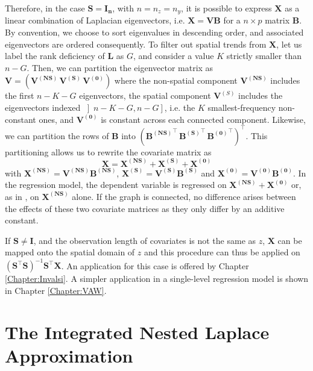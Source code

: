 \documentclass[openany, 11pt, oneside]{book}
\begin{document}
Therefore, in the case $\boldsymbol{S} = \boldsymbol{I_n}$, with $n=n_z = n_y$, it is possible to express $\boldsymbol{X}$ as a linear combination of Laplacian eigenvectors, i.e. $\boldsymbol{X} = \boldsymbol{V B}$ for a $n\times p$ matrix $\boldsymbol{B}$. By convention, we choose to sort eigenvalues in descending order, and associated eigenvectors are ordered consequently. To filter out spatial trends from $\boldsymbol{X}$, let us label the rank deficiency of $\boldsymbol{L}$ as $G$, and consider a value $K$ strictly smaller than $n-G$. Then, we can partition the eigenvector matrix as $\boldsymbol{V} = \left(\boldsymbol{V^{(NS)}}\,\boldsymbol{V^{(S)}}\,\boldsymbol{V^{(0)}} \right)$ where the non-spatial component $\boldsymbol{V^{(NS)}}$ includes the first $n-K-G$ eigenvectors, the spatial component $\boldsymbol{V}^{(S)}$ includes the eigenvectors indexed $\left] n-K-G, n-G\right]$, i.e. the $K$ smallest-frequency non-constant ones, and $\boldsymbol{V^{(0)}}$ is constant across each connected component. Likewise, we can partition the rows of $\boldsymbol{B}$ into $\left( \boldsymbol{{B^{(NS)}}^\top \, {B^{(S)}}^\top \, {B^{(0)}}^\top} \right)^\top$. This partitioning allows us to rewrite the covariate matrix as
$$
\boldsymbol{X} = \boldsymbol{X ^{(NS) }} +  \boldsymbol{X ^{(S) }} + \boldsymbol{X ^{(0) }}
$$
with $\boldsymbol{X^{(NS)}}=\boldsymbol{V^{(NS)} B^{(NS)}}$, $\boldsymbol{X^{(S)}}=\boldsymbol{V^{(S)} B^{(S)}}$ and $\boldsymbol{X^{(0)}}=\boldsymbol{V^{(0)} B^{(0)}}$. In the regression model, the dependent variable is regressed on $\boldsymbol{X ^{(NS) }} + \boldsymbol{X ^{(0) }}$ or, as in \cite{Urdangarin24}, on $\boldsymbol{X ^{(NS) }}$ alone. If the graph  is connected, no difference arises between the effects of these two covariate matrices as they only differ by an additive constant. 

If $\boldsymbol{S} \neq \boldsymbol{I}$, and the observation length of covariates is not the same as $z$, $\boldsymbol{X}$ can be mapped onto the spatial domain of $z$ and this procedure can thus be applied on $\left( \boldsymbol{S^\top S} \right)^{-1} \boldsymbol{S^\top X} $. An application for this case is offered by Chapter \ref{Chapter:Invalsi}. A simpler application in a single-level regression model is shown in Chapter \ref{Chapter:VAW}.




\section{The Integrated Nested Laplace Approximation} \label{section:INLA}
\end{document}
